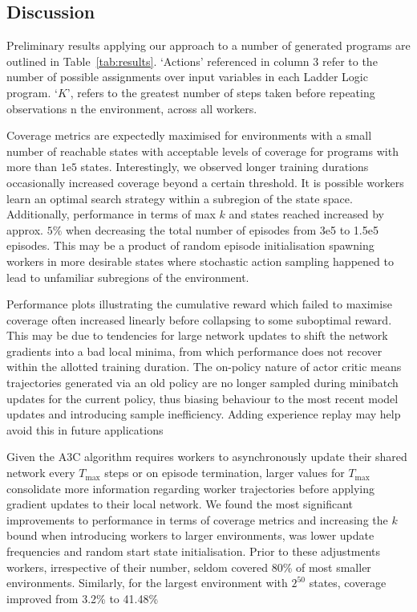 \documentclass[conference,compsoc]{IEEEtran}
\begin{document}
\subsection{Discussion}
Preliminary results applying our approach to a number of generated programs are outlined in Table~\ref{tab:results}. `Actions' referenced in column 3 refer to the number of possible assignments over input variables in each Ladder Logic program. `$K$', refers to the greatest number of steps taken before repeating observations n the environment, across all workers.

Coverage metrics are expectedly maximised for environments with a small number of reachable states with acceptable levels of coverage for programs with more than $1\mathrm{e}{5}$ states. Interestingly, we observed longer training durations occasionally increased coverage beyond a certain threshold. It is possible workers learn an optimal search strategy within a subregion of the state space. Additionally, performance in terms of max $k$ and states reached increased by approx. $5\%$ when decreasing the total number of episodes from 3e5 to 1.5e5 episodes.  This may be a product of random episode initialisation spawning workers in more desirable states where stochastic action sampling happened to lead to unfamiliar subregions of the environment.

Performance plots illustrating the cumulative reward  which failed to maximise coverage often increased linearly before collapsing to some suboptimal reward.  This may be due to tendencies for large network updates to shift the network gradients into a bad local minima, from which performance does not recover within the allotted training duration. The on-policy nature of actor critic means trajectories generated via an old policy are no longer sampled during minibatch updates for the current policy,  thus biasing behaviour to the most recent model updates and introducing sample inefficiency. Adding experience replay \cite{wang2017sample} may help avoid this in future applications

Given the A3C algorithm requires workers to asynchronously update their shared network every $T_{\max}$ steps or on episode termination, larger values for $T_{\max}$ consolidate more information regarding worker trajectories before applying gradient updates to their local network. We found the most significant improvements to performance in terms of coverage metrics and increasing the $k$ bound when introducing workers to larger environments, was lower update frequencies and random start state initialisation. Prior to these adjustments workers, irrespective of their number, seldom covered 80\% of most smaller environments. Similarly, for the largest environment with $2^{50}$ states, coverage improved from 3.2\% to 41.48\%
\end{document}

